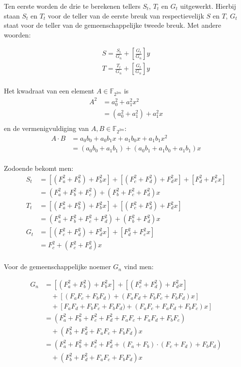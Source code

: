 Ten eerste worden de drie te berekenen tellers $S_t$, $T_t$ en $G_t$ uitgewerkt. Hierbij staan $S_t$ en $T_t$ voor de teller van de eerste breuk van respectievelijk $S$ en $T$, $G_t$ staat voor de teller van de gemeenschappelijke tweede breuk. Met andere woorden:

\[\begin{aligned}
S = \frac{S_t}{G_n} + \left[ \frac{G_t}{G_n} \right] y\\
T = \frac{T_t}{G_n} + \left[ \frac{G_t}{G_n} \right] y\\
\end{aligned}\]

Het kwadraat van een element $A \in \mathbb{F}_{2^{2m}}$ is
\[\begin{aligned}
A^2	&= a_0^2 + a_1^2 x^2\\
		&= (a_0^2 + a_1^2) + a_1^2 x\\
\end{aligned}\]
en de vermenigvuldiging van $A, B \in \mathbb{F}_{2^{2m}}$:
\[\begin{aligned}
A \cdot B	&= a_0 b_0 + a_0 b_1 x + a_1 b_0 x + a_1 b_1 x^2\\
				&= (a_0 b_0 + a_1 b_1) + (a_0 b_1 + a_1 b_0 + a_1 b_1)x\\
\end{aligned}\]

Zodoende bekomt men:
\[\begin{aligned}
S_t	&= [(F_a^2 + F_b^2) + F_b^2 x] + [(F_c^2 + F_d^2) + F_d^2x] + [F_d^2 + F_c^2x]\\
		&= (F_a^2 + F_b^2 + F_c^2) + (F_b^2 + F_c^2 + F_d^2)x\\
T_t	&= [(F_a^2 + F_b^2) + F_b^2 x] + [(F_c^2 + F_d^2) + F_d^2x]\\
		&= (F_a^2 + F_b^2 + F_c^2 + F_d^2) + (F_b^2 + F_d^2)x\\
G_t	&= [(F_c^2 + F_d^2) + F_d^2x] + [F_d^2 + F_c^2x]\\
		&= F_c^2 + (F_c^2 + F_d^2)x\\
\end{aligned}\]

Voor de gemeenschappelijke noemer $G_n$ vind men:

\[\begin{aligned}
G_n	&= [(F_a^2 + F_b^2) + F_b^2 x] + [(F_c^2 + F_d^2) + F_d^2x]\\
			&\quad + [(F_a F_c + F_b F_d) + (F_a F_d + F_b F_c + F_b F_d)x]\\
			&\quad + [F_a F_d + F_b F_c + F_b F_d) + (F_a F_c + F_a F_d + F_b F_c)x]\\
		&= (F_a^2 + F_b^2 + F_c^2 + F_d^2 + F_a F_c + F_a F_d + F_b F_c)\\
			&\quad + (F_b^2 + F_d^2 + F_a F_c + F_b F_d)x\\
		&= (F_a^2 + F_b^2 + F_c^2 + F_d^2 + (F_a + F_b) \cdot (F_c + F_d) + F_b F_d)\\
			&\quad + (F_b^2 + F_d^2 + F_a F_c + F_b F_d)x\\
\end{aligned}\]

